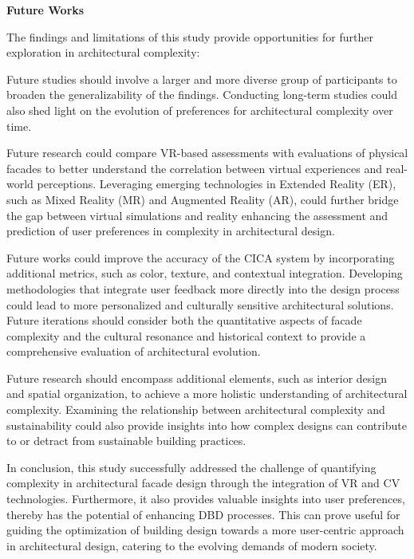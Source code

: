 \textbf{Future Works}

The findings and limitations of this study provide opportunities for further exploration in architectural complexity:

Future studies should involve a larger and more diverse group of participants to broaden the generalizability of the findings.
Conducting long-term studies could also shed light on the evolution of preferences for architectural complexity over time.

Future research could compare VR-based assessments with evaluations of physical facades to better understand the correlation between virtual experiences and real-world perceptions.
Leveraging emerging technologies in Extended Reality (ER), such as Mixed Reality (MR) and Augmented Reality (AR), could further bridge the gap between virtual simulations and reality enhancing the assessment and prediction of user preferences in complexity in architectural design.

Future works could improve the accuracy of the CICA system by incorporating additional metrics, such as color, texture, and contextual integration.
Developing methodologies that integrate user feedback more directly into the design process could lead to more personalized and culturally sensitive architectural solutions.
Future iterations should consider both the quantitative aspects of facade complexity and the cultural resonance and historical context to provide a comprehensive evaluation of architectural evolution.

Future research should encompass additional elements, such as interior design and spatial organization, to achieve a more holistic understanding of architectural complexity.
Examining the relationship between architectural complexity and sustainability could also provide insights into how complex designs can contribute to or detract from sustainable building practices.

In conclusion, this study successfully addressed the challenge of quantifying complexity in architectural facade design through the integration of VR and CV technologies.
Furthermore, it also provides valuable insights into user preferences, thereby has the potential of enhancing DBD processes.
This can prove useful for guiding the optimization of building design towards a more user-centric approach in architectural design, catering to the evolving demands of modern society.